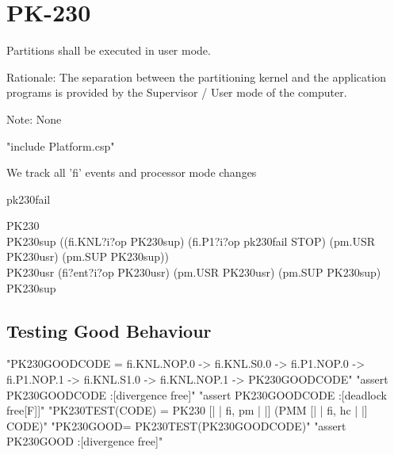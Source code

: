 \section{PK-230}


       Partitions shall be executed in user mode.

  Rationale: The separation between the partitioning kernel and the application
  programs is provided by the Supervisor / User mode of the computer.

  Note: None


\begin{assert} "include Platform.csp" \end{assert}

We track all 'fi' events and processor mode changes

\begin{circus}
\circchannel pk230fail\\
\end{circus}

\begin{circus}
\circprocess PK230 \circdef \circbegin\\ %
PK230sup
 \circdef  ((fi.KNL?i?op \then PK230sup)
    \extchoice
    (fi.P1?i?op \then pk230fail \then STOP)
    \extchoice
    (pm.USR \then PK230usr)
    \extchoice
    (pm.SUP \then PK230sup))\\
PK230usr
 \circdef  (fi?ent?i?op \then PK230usr)
    \extchoice
    (pm.USR \then PK230usr)
    \extchoice
    (pm.SUP \then PK230sup)\\
  \circspot PK230sup\\
\circend
\end{circus}

\subsection{Testing Good Behaviour}

\begin{assert}
"PK230GOODCODE = fi.KNL.NOP.0 -> fi.KNL.S0.0  -> fi.P1.NOP.0  -> fi.P1.NOP.1  -> fi.KNL.S1.0  -> fi.KNL.NOP.1 -> PK230GOODCODE"
\also "assert PK230GOODCODE :[divergence free]"
\also "assert PK230GOODCODE :[deadlock free[F]]"
\also "PK230TEST(CODE) = PK230 [| {| fi, pm |} |] (PMM [| {| fi, hc |} |] CODE)"
\also "PK230GOOD= PK230TEST(PK230GOODCODE)"
\also "assert PK230GOOD :[divergence free]"
\end{assert}

